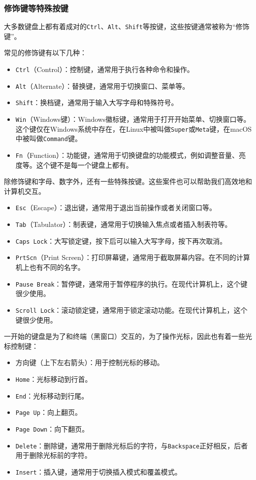 \subsubsection{修饰键等特殊按键}

大多数键盘上都有着成对的\texttt{Ctrl}、\texttt{Alt}、\texttt{Shift}等按键，这些按键通常被称为“修饰键”。

常见的修饰键有以下几种：
\begin{itemize}
  \item \texttt{Ctrl}（Control）：控制键，通常用于执行各种命令和操作。
  \item \texttt{Alt}（Alternate）：替换键，通常用于切换窗口、菜单等。
  \item \texttt{Shift}：换档键，通常用于输入大写字母和特殊符号。
  \item \texttt{Win}（Windows键）：Windows徽标键，通常用于打开开始菜单、切换窗口等。这个键仅在Windows系统中存在，在Linux中被叫做\texttt{Super}或\texttt{Meta}键，在macOS中被叫做\texttt{Command}键。
  \item \texttt{Fn}（Function）：功能键，通常用于切换键盘的功能模式，例如调整音量、亮度等。这个键不是每一个键盘上都有。
\end{itemize}

除修饰键和字母、数字外，还有一些特殊按键。这些案件也可以帮助我们高效地和计算机交互。
\begin{itemize}
  \item \texttt{Esc}（Escape）：退出键，通常用于退出当前操作或者关闭窗口等。
  \item \texttt{Tab}（Tabulator）：制表键，通常用于切换输入焦点或者插入制表符等。
  \item \texttt{Caps Lock}：大写锁定键，按下后可以输入大写字母，按下再次取消。
  \item \texttt{PrtScn}（Print Screen）：打印屏幕键，通常用于截取屏幕内容。在不同的计算机上也有不同的名字。
  \item \texttt{Pause Break}：暂停键，通常用于暂停程序的执行。在现代计算机上，这个键很少使用。
  \item \texttt{Scroll Lock}：滚动锁定键，通常用于锁定滚动功能。在现代计算机上，这个键很少使用。
\end{itemize}

一开始的键盘是为了和终端（黑窗口）交互的，为了操作光标，因此也有着一些光标控制键：
\begin{itemize}
  \item 方向键（上下左右箭头）：用于控制光标的移动。
  \item \texttt{Home}：光标移动到行首。
  \item \texttt{End}：光标移动到行尾。
  \item \texttt{Page Up}：向上翻页。
  \item \texttt{Page Down}：向下翻页。
  \item \texttt{Delete}：删除键，通常用于删除光标后的字符，与\texttt{Backspace}正好相反，后者用于删除光标前的字符。
  \item \texttt{Insert}：插入键，通常用于切换插入模式和覆盖模式。
\end{itemize}

